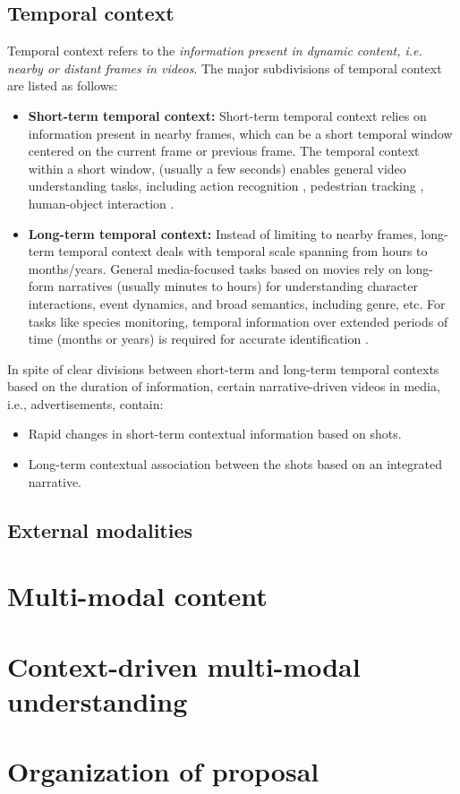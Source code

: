 \subsection{Temporal context}
Temporal context refers to the \textit{information present in dynamic content, i.e. nearby or distant frames in videos}. The major subdivisions of temporal context are listed as follows:
\begin{itemize}
\item \textbf{Short-term temporal context:} Short-term temporal context relies on information present in nearby frames, which can be a short temporal window centered on the current frame or previous frame. The temporal context within a short window, (usually a few seconds) enables general video understanding tasks, including action recognition \cite{Carreira2017QuoVA}, pedestrian tracking \cite{Yan2019LearningCG}, human-object interaction \cite{Ji2021DetectingHR}. 
\item \textbf{Long-term temporal context:} Instead of limiting to nearby frames, long-term temporal context deals with temporal scale spanning from hours to months/years. General media-focused tasks based on movies \cite{Wu2021TowardsLV,Soldan2021MADAS} rely on long-form narratives (usually minutes to hours) for understanding character interactions, event dynamics, and broad semantics, including genre, etc. For tasks like species monitoring, temporal information over extended periods of time (months or years) is required for accurate identification \cite{Beery2019ContextRL}. 
\end{itemize}
In spite of clear divisions between short-term and long-term temporal contexts based on the duration of information, certain narrative-driven videos in media, i.e., advertisements, contain: 
\begin{itemize}
\item Rapid changes in short-term contextual information based on shots. 
\item Long-term contextual association between the shots based on an integrated narrative.
\end{itemize}
\subsection{External modalities}

\section{Multi-modal content}
\section{Context-driven multi-modal understanding}
\section{Organization of proposal}

